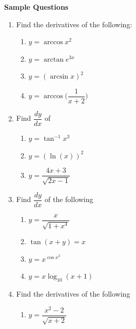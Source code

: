 \documentclass[11pt,a4paper]{article}
\begin{document}
\textbf{Sample Questions}
\begin{enumerate}
\item Find the derivatives of the following:
\begin{enumerate}
        \item $y=\arccos x^2$\\
        
        \item $y=\arctan e^{\displaystyle {3x}}$\\
        
        \item $y=(\arcsin x)^2$\\
        
        \item $y=\arccos \bigg(\dfrac{1}{x+2}\bigg)$\\
\end{enumerate}



\item Find $\dfrac{dy}{dx}$ of  
\begin{enumerate}
       \item $y=\tan^{-1}x^3$\\

       \item $y=(\ln(x))^2$\\
      
       \item $y=\dfrac{4x+3}{\sqrt{2x-1}}$\\
\end{enumerate}


\item Find $\dfrac{dy}{dx}$ of the following
\begin{enumerate}
       \item $y=\dfrac{x}{\sqrt{1+x^4}}$\\
       
       \item $\tan (x+y)=x$\\
       
       \item $y=x^{\displaystyle{\cos x^2}}$\\
       
       \item $y=x\log_{10}(x+1)$\\
      
\end{enumerate}


\item Find the derivatives of the following
\begin{enumerate}
      \item $y=\dfrac{x^2-2}{\sqrt{x+2}}$\\
      

\end{enumerate}
\end{enumerate}
\end{document}
